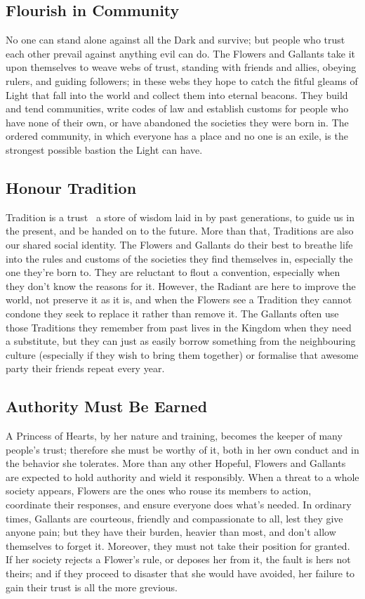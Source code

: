 \subsection*{Flourish in Community}

No one can stand alone against all the Dark and survive; but people who trust each other prevail against anything evil can do. The Flowers and Gallants take it upon themselves to weave webs of trust, standing with friends and allies, obeying rulers, and guiding followers; in these webs they hope to catch the fitful gleams of Light that fall into the world and collect them into eternal beacons. They build and tend communities, write codes of law and establish customs for people who have none of their own, or have abandoned the societies they were born in. The ordered community, in which everyone has a place and no one is an exile, is the strongest possible bastion the Light can have.

\subsection*{Honour Tradition}

Tradition is a trust \textendash\, a store of wisdom laid in by past generations, to guide us in the present, and be handed on to the future. More than that, Traditions are also our shared social identity. The Flowers and Gallants do their best to breathe life into the rules and customs of the societies they find themselves in, especially the one they're born to. They are reluctant to flout a convention, especially when they don't know the reasons for it.  However, the Radiant are here to improve the world, not preserve it as it is, and when the Flowers see a Tradition they cannot condone they seek to replace it rather than remove it. The Gallants often use those Traditions they remember from past lives in the Kingdom when they need a substitute, but they can just as easily borrow something from the neighbouring culture (especially if they wish to bring them together) or formalise that awesome party their friends repeat every year. 

\subsection*{Authority Must Be Earned}
A Princess of Hearts, by her nature and training, becomes the keeper of many people's trust; therefore she must be worthy of it, both in her own conduct and in the behavior she tolerates. More than any other Hopeful, Flowers and Gallants are expected to hold authority and wield it responsibly. When a threat to a whole society appears, Flowers are the ones who rouse its members to action, coordinate their responses, and ensure everyone does what's needed. In ordinary times, Gallants are courteous, friendly and compassionate to all, lest they give anyone pain; but they have their burden, heavier than most, and don't allow themselves to forget it. Moreover, they must not take their position for granted. If her society rejects a Flower's rule, or deposes her from it, the fault is hers not theirs; and if they proceed to disaster that she would have avoided, her failure to gain their trust is all the more grevious.

